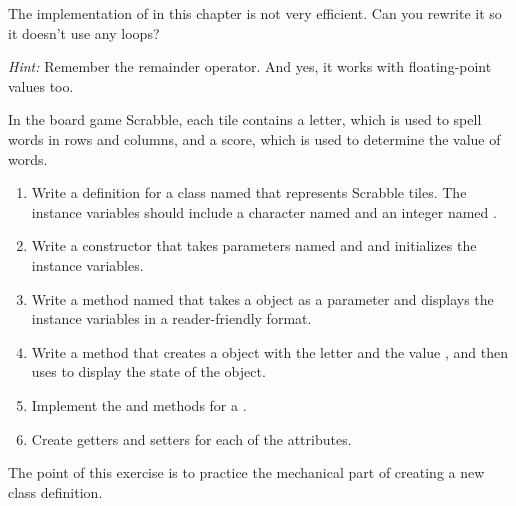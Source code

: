\begin{exercise}  %

The implementation of  in this chapter is not very efficient.
Can you rewrite it so it doesn't use any loops?

{\it Hint:} Remember the remainder operator. And yes, it works with floating-point values too.

\end{exercise}


\begin{exercise}  %

In the board game Scrabble, each tile contains a letter, which is used to spell words in rows and columns, and a score, which is used to determine the value of words.

\begin{enumerate}

\item Write a definition for a class named  that represents Scrabble tiles.
The instance variables should include a character named  and an integer named .

\item Write a constructor that takes parameters named  and  and initializes the instance variables.

\item Write a method named  that takes a  object as a parameter and displays the instance variables in a reader-friendly format.

\item Write a  method that creates a  object with the letter  and the value , and then uses  to display the state of the object.

\item Implement the  and  methods for a .

\item Create getters and setters for each of the attributes.

\end{enumerate}

The point of this exercise is to practice the mechanical part of creating a new class definition.
\end{exercise}


